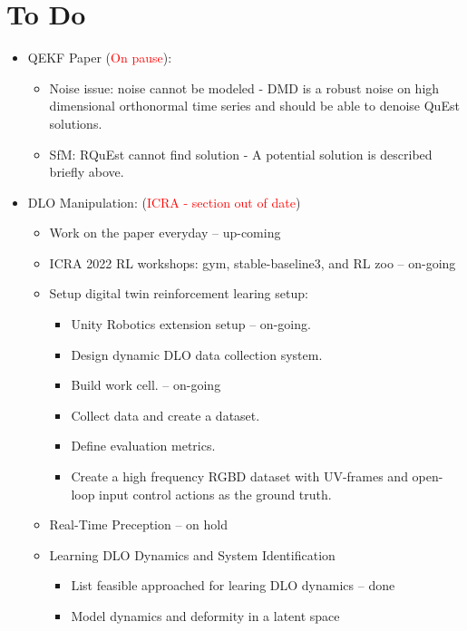\documentclass[11pt]{article}
\begin{document}
\section{To Do}
\begin{itemize}
  \item QEKF Paper (\textcolor{red}{On pause}):
  \begin{itemize}
      \item Noise issue: noise cannot be modeled - DMD is a robust noise on high dimensional orthonormal time series and should be able to denoise QuEst solutions.
      \item SfM: RQuEst cannot find solution - A potential solution is described  briefly above.
  \end{itemize}
  \item  DLO Manipulation: (\textcolor{red}{ICRA - section out of date})
  \begin{itemize}
      \item Work on the paper everyday -- up-coming
      \item ICRA 2022 RL workshops: gym, stable-baseline3, and RL zoo -- on-going
      \item Setup digital twin reinforcement learing setup:
      \begin{itemize}
        \item Unity Robotics extension setup -- on-going.
        \item Design dynamic DLO data collection system.
        \item Build work cell. -- on-going
        \item Collect data and create a dataset.
        \item Define evaluation metrics.
        \item Create a high frequency RGBD dataset with UV-frames and open-loop input control actions as the ground truth.
      \end{itemize}
      \item Real-Time Preception -- on hold
      \item Learning DLO Dynamics and System Identification
      \begin{itemize}
            \item List feasible approached for learing DLO dynamics -- done
            \item Model dynamics and deformity in a latent space
      \end{itemize}
  \end{itemize}
\end{itemize}
\end{document}
